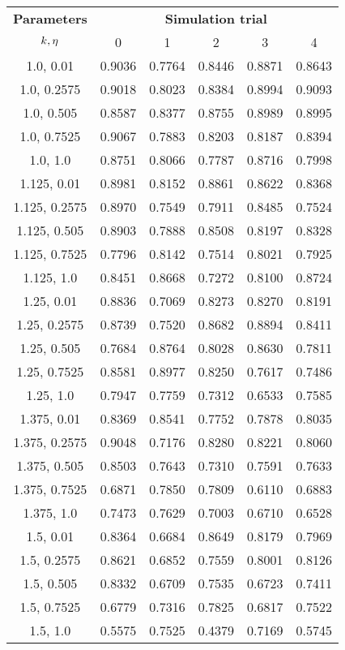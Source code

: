 \begin{tabular}{cccccc}
\hline
\textbf{Parameters}         & \multicolumn{5}{c}{\textbf{Simulation trial}} \\
$k, \eta$ & 0       & 1       & 2       & 3      & 4      \\ \hline
1.0, 0.01                   & 0.9036  & 0.7764  & 0.8446  & 0.8871 & 0.8643 \\
1.0, 0.2575                 & 0.9018  & 0.8023  & 0.8384  & 0.8994 & 0.9093 \\
1.0, 0.505                  & 0.8587  & 0.8377  & 0.8755  & 0.8989 & 0.8995 \\
1.0, 0.7525                 & 0.9067  & 0.7883  & 0.8203  & 0.8187 & 0.8394 \\
1.0, 1.0                    & 0.8751  & 0.8066  & 0.7787  & 0.8716 & 0.7998 \\
1.125, 0.01                 & 0.8981  & 0.8152  & 0.8861  & 0.8622 & 0.8368 \\
1.125, 0.2575               & 0.8970  & 0.7549  & 0.7911  & 0.8485 & 0.7524 \\
1.125, 0.505                & 0.8903  & 0.7888  & 0.8508  & 0.8197 & 0.8328 \\
1.125, 0.7525               & 0.7796  & 0.8142  & 0.7514  & 0.8021 & 0.7925 \\
1.125, 1.0                  & 0.8451  & 0.8668  & 0.7272  & 0.8100 & 0.8724 \\
1.25, 0.01                  & 0.8836  & 0.7069  & 0.8273  & 0.8270 & 0.8191 \\
1.25, 0.2575                & 0.8739  & 0.7520  & 0.8682  & 0.8894 & 0.8411 \\
1.25, 0.505                 & 0.7684  & 0.8764  & 0.8028  & 0.8630 & 0.7811 \\
1.25, 0.7525                & 0.8581  & 0.8977  & 0.8250  & 0.7617 & 0.7486 \\
1.25, 1.0                   & 0.7947  & 0.7759  & 0.7312  & 0.6533 & 0.7585 \\
1.375, 0.01                 & 0.8369  & 0.8541  & 0.7752  & 0.7878 & 0.8035 \\
1.375, 0.2575               & 0.9048  & 0.7176  & 0.8280  & 0.8221 & 0.8060 \\
1.375, 0.505                & 0.8503  & 0.7643  & 0.7310  & 0.7591 & 0.7633 \\
1.375, 0.7525               & 0.6871  & 0.7850  & 0.7809  & 0.6110 & 0.6883 \\
1.375, 1.0                  & 0.7473  & 0.7629  & 0.7003  & 0.6710 & 0.6528 \\
1.5, 0.01                   & 0.8364  & 0.6684  & 0.8649  & 0.8179 & 0.7969 \\
1.5, 0.2575                 & 0.8621  & 0.6852  & 0.7559  & 0.8001 & 0.8126 \\
1.5, 0.505                  & 0.8332  & 0.6709  & 0.7535  & 0.6723 & 0.7411 \\
1.5, 0.7525                 & 0.6779  & 0.7316  & 0.7825  & 0.6817 & 0.7522 \\
1.5, 1.0                    & 0.5575  & 0.7525  & 0.4379  & 0.7169 & 0.5745 \\ \hline
\end{tabular}